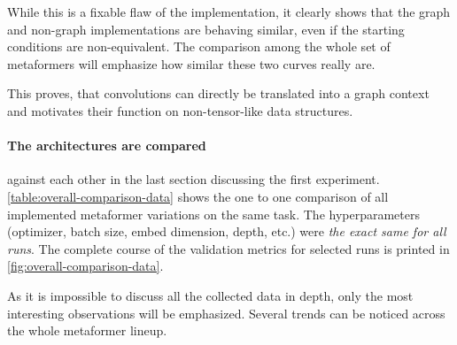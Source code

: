 While this is a fixable flaw of the implementation, it clearly shows that the graph and non-graph implementations are behaving similar, even if the starting conditions are non-equivalent.
The comparison among the whole set of metaformers will emphasize how similar these two curves really are.

This proves, that convolutions can directly be translated into a graph context and motivates their function on non-tensor-like data structures.

\FloatBarrier
\paragraph{The architectures are compared} against each other in the last section discussing the first experiment. 
\autoref{table:overall-comparison-data} shows the one to one comparison of all implemented metaformer variations on the same task.
The hyperparameters (optimizer, batch size, embed dimension, depth, etc.) were \emph{the exact same for all runs}. 
The complete course of the validation metrics for selected runs is printed in \autoref{fig:overall-comparison-data}.

As it is impossible to discuss all the collected data in depth, only the most interesting observations will be emphasized.
Several trends can be noticed across the whole metaformer lineup. 


